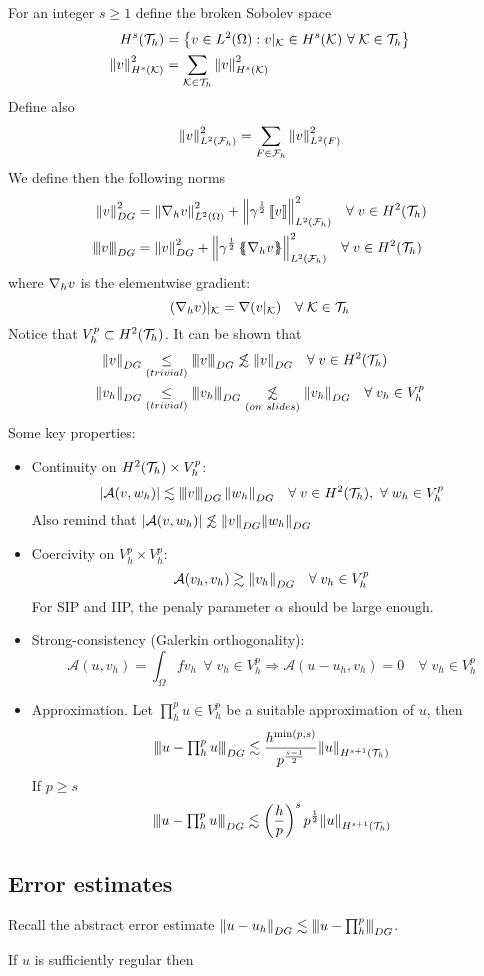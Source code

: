 For an integer \(s \geq 1\) define the broken Sobolev space
\begin{align*}
    H^s(\mathcal{T}_h) &= \left\{ v \in L^2(\Omega) : v\vert_{\mathcal{K}} \in H^s(\mathcal{K}) \ \forall \;\mathcal{K} \in \mathcal{T}_h\right\} \\
    \norm{v}^2_{H^s(\mathcal{K})} &= \sum_{\mathcal{K} \in \mathcal{T}_h} \norm{v}^2_{H^s(\mathcal{K})}
\end{align*}
Define also 
\[
    \norm{v}^2_{L^2(\mathcal{F}_h)} = \sum_{F \in \mathcal{F}_h} \norm{v}^2_{L^2(F)}
\]
We define then the following norms 
\begin{align*}
    \norm{v}^2_{DG} &= \norm{\grad_h v}^2_{L^2(\Omega)} + \norm{\gamma^{\frac{1}{2}}\jump{v}}^2_{L^2(\mathcal{F}_h)} \quad \forall \;v \in H^2(\triangulation) \\
    \threenorm{v}{DG} &= \norm{v}_{DG}^2 + \norm{\gamma ^{\frac{1}{2}} \average{\grad_h v}}^2_{L^2(\mathcal{F}_h)} \quad \forall \;v \in H^2(\triangulation)
\end{align*}
where \(\nabla_h v\) is the elementwise gradient:
\[
    (\nabla_h v)\vert_{\mathcal{K}} = \nabla(v\vert_{\mathcal{K}}) \quad\forall \; \mathcal{K} \in \mathcal{T}_h
\]
Notice that \(V_h^p \subset H^2(\mathcal{T}_h)\). It can be shown that 
\begin{align*}
    \norm{v}_{DG} &\underset{(trivial)}{\leq} \threenorm{v}{DG} \not\lesssim \norm{v}_{DG} \quad \forall \; v \in H^2(\triangulation) \\
    \norm{v_h}_{DG} &\underset{(trivial)}{\leq} \threenorm{v_h}{DG} \underset{(on \ slides)}{\not\lesssim}\norm{v_h}_{DG} \quad \forall \; v_h \in V_h^p \\
\end{align*}
Some key properties:
\begin{itemize}
    \item Continuity on \(H^2(\mathcal{T}_h) \times V^p_h\): 
    \[
        \abs{\mathcal{A}(v, w_h)} \lesssim \threenorm{v}{DG} \norm{w_h}_{DG} \quad  \forall \; v \in H^2(\triangulation), \ \forall \; w_h \in V_h^p
    \]
    Also remind that \(\abs{\mathcal{A}(v, w_h)} \not\lesssim \norm{v}_{DG} \norm{w_h}_{DG}\)
    \item Coercivity on \(V_h^p \times V_h^p\): 
    \[
        \mathcal{A}(v_h, v_h) \gtrsim \norm{v_h}_{DG} \quad \forall \; v_h \in V_h^p
    \]
    For SIP and IIP, the penaly parameter \(\alpha\) should be large enough.
    \item  Strong-consistency (Galerkin orthogonality):
    \[
        \mathcal{A}(u,v_h) = \int_\Omega f v_h \ \ \forall \; v_h \in V_h^p \Rightarrow \mathcal{A}(u-u_h, v_h) = 0 \quad \forall \; v_h \in V_h^p
    \]
    \item Approximation. Let \(\prod_{h}^{p}u \in V_h^p\) be a suitable approximation of \(u\), then 
    \[
        \threenorm{u-{\textstyle \prod_{h}^{p}u}}{DG} \lesssim \frac{h^{\min(p,s)}}{p^{\frac{s-1}{2}}}\norm{u}_{H^{s+1}(\triangulation)}
    \]
    If \(p \geq s\)
    \[
        \threenorm{u-{\textstyle \prod_{h}^{p}u}}{DG} \lesssim \left( \frac{h}{p} \right)^s p^{\frac{1}{2}}\norm{u}_{H^{s+1}(\triangulation)}
    \]
\end{itemize}
\subsection{Error estimates}
Recall the abstract error estimate \(\norm{u - u_h}_{DG} \lesssim \threenorm{u-\prod_{h}^{p}}{DG}\).

If \(u\) is sufficiently regular then